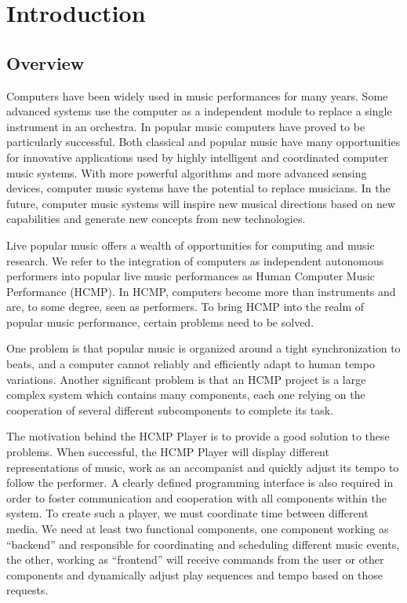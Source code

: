 \chapter{Introduction}

\ifpdf
    \graphicspath{{1_introduction/figures/PNG/}{1_introduction/figures/PDF/}{1_introduction/figures/}}
\else
    \graphicspath{{1_introduction/figures/EPS/}{1_introduction/figures/}}
\fi

\section{Overview}
Computers have been widely used in music performances for many years. Some
advanced systems use the computer as a independent module to replace a
single instrument in an orchestra. In popular music computers have proved
to be particularly successful. Both classical and popular music have many
opportunities for innovative applications used by highly intelligent and
coordinated computer music systems. With more powerful algorithms and more
advanced sensing devices, computer music systems have the potential to
replace musicians. In the future, computer music systems will inspire new 
musical directions based on new
capabilities and generate new concepts from new technologies.

Live popular music offers a wealth of opportunities for computing and music
research.  We refer to the integration of computers as independent autonomous
performers into popular live music performances as Human Computer Music
Performance (HCMP). In HCMP, computers become more than instruments and are,
to some degree, seen as performers. To bring HCMP into the realm of popular
music performance, certain problems need to be solved. 

One problem is that
popular music is organized around a tight synchronization to beats, and a
computer cannot reliably and efficiently adapt to human tempo variations.
Another significant problem is that an HCMP project is a large complex
system which contains many components, each one relying on the cooperation of several
different subcomponents to complete its task.

The motivation behind the HCMP Player is to provide a good solution to these
problems. When successful, the HCMP Player will display different
representations of music, work as an accompanist and quickly adjust its
tempo to follow the performer. A clearly defined programming interface is
also required in order to foster communication and cooperation with all
components within the system. To create such a player, we must coordinate
time between different media. We need at least two functional components,
one component working as ``backend'' and responsible for coordinating and
scheduling different music events, the other, working as ``frontend'' will
receive commands from the user or other components and dynamically adjust
play sequences and tempo based on those requests.

